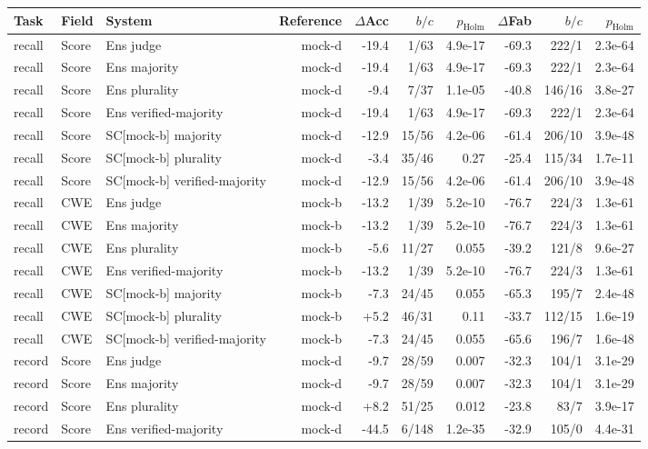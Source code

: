 \begin{tabular}{lllrrrrrrr}
\toprule
Task & Field & System & Reference & $\Delta$Acc & $b/c$ & $p_{\mathrm{Holm}}$ & $\Delta$Fab & $b/c$ & $p_{\mathrm{Holm}}$ \\
\midrule
recall & Score & Ens judge & mock-d & -19.4 & 1/63 & 4.9e-17 & -69.3 & 222/1 & 2.3e-64 \\
recall & Score & Ens majority & mock-d & -19.4 & 1/63 & 4.9e-17 & -69.3 & 222/1 & 2.3e-64 \\
recall & Score & Ens plurality & mock-d & -9.4 & 7/37 & 1.1e-05 & -40.8 & 146/16 & 3.8e-27 \\
recall & Score & Ens verified-majority & mock-d & -19.4 & 1/63 & 4.9e-17 & -69.3 & 222/1 & 2.3e-64 \\
recall & Score & SC[mock-b] majority & mock-d & -12.9 & 15/56 & 4.2e-06 & -61.4 & 206/10 & 3.9e-48 \\
recall & Score & SC[mock-b] plurality & mock-d & -3.4 & 35/46 & 0.27 & -25.4 & 115/34 & 1.7e-11 \\
recall & Score & SC[mock-b] verified-majority & mock-d & -12.9 & 15/56 & 4.2e-06 & -61.4 & 206/10 & 3.9e-48 \\
recall & CWE & Ens judge & mock-b & -13.2 & 1/39 & 5.2e-10 & -76.7 & 224/3 & 1.3e-61 \\
recall & CWE & Ens majority & mock-b & -13.2 & 1/39 & 5.2e-10 & -76.7 & 224/3 & 1.3e-61 \\
recall & CWE & Ens plurality & mock-b & -5.6 & 11/27 & 0.055 & -39.2 & 121/8 & 9.6e-27 \\
recall & CWE & Ens verified-majority & mock-b & -13.2 & 1/39 & 5.2e-10 & -76.7 & 224/3 & 1.3e-61 \\
recall & CWE & SC[mock-b] majority & mock-b & -7.3 & 24/45 & 0.055 & -65.3 & 195/7 & 2.4e-48 \\
recall & CWE & SC[mock-b] plurality & mock-b & +5.2 & 46/31 & 0.11 & -33.7 & 112/15 & 1.6e-19 \\
recall & CWE & SC[mock-b] verified-majority & mock-b & -7.3 & 24/45 & 0.055 & -65.6 & 196/7 & 1.6e-48 \\
record & Score & Ens judge & mock-d & -9.7 & 28/59 & 0.007 & -32.3 & 104/1 & 3.1e-29 \\
record & Score & Ens majority & mock-d & -9.7 & 28/59 & 0.007 & -32.3 & 104/1 & 3.1e-29 \\
record & Score & Ens plurality & mock-d & +8.2 & 51/25 & 0.012 & -23.8 & 83/7 & 3.9e-17 \\
record & Score & Ens verified-majority & mock-d & -44.5 & 6/148 & 1.2e-35 & -32.9 & 105/0 & 4.4e-31 \\

\end{tabular}
